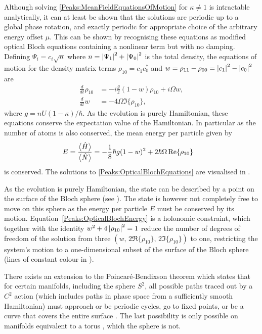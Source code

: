 Although solving \eqref{Peaks:MeanFieldEquationsOfMotion} for $\kappa \neq 1$ is intractable analytically, it can at least be shown that the solutions are periodic up to a global phase rotation, and exactly periodic for appropriate choice of the arbitrary energy offset $\mu$. This can be shown by recognising these equations as modified optical Bloch equations \citep[\S 5.B]{Scully} containing a nonlinear term but with no damping. Defining $\Psi_i = c_i\sqrt{n}$ where $n = \left|\Psi_1\right|^2 + \left|\Psi_0\right|^2$ is the total density, the equations of motion for the density matrix terms $\rho_{10} = c_{1}^{}c_{0}^*$ and $w = \rho_{11}-\rho_{00} = \left|c_1\right|^2 - \left|c_0\right|^2$ are
\begin{subequations}
    \label{Peaks:OpticalBlochEquations}
    \begin{align}
        \frac{d}{dt}\rho_{10} &= -i\frac{g}{2} (1-w)\rho_{10} + i \Omega w,\\
        \frac{d }{dt}w &= -4 \Omega \Im\{\rho_{10}\},
    \end{align}
\end{subequations}
where $g = n U (1-\kappa)/\hbar$. As the evolution is purely Hamiltonian, these equations conserve the expectation value of the Hamiltonian. In particular as the number of atoms is also conserved, the mean energy per particle given by
\begin{align}
    E &= \frac{\mean{\hat{H}}}{\mean{\hat{N}}} = -\frac{1}{8}\hbar g(1 - w)^2 + 2 \hbar \Omega \Re\{\rho_{10}\}
    \label{Peaks:OpticalBlochEnergy}
\end{align}
is conserved. The solutions to \eqref{Peaks:OpticalBlochEquations} are visualised in .

As the evolution is purely Hamiltonian, the state can be described by a point on the surface of the Bloch sphere (see ).  The state is however not completely free to move on this sphere as the energy per particle $E$ must be conserved by its motion.  Equation~\eqref{Peaks:OpticalBlochEnergy} is a holonomic constraint, which together with the identity $w^2 + 4 \left|\rho_{10}\right|^2 = 1$ reduce the number of degrees of freedom of the solution from three $(w,\, 2\Re\{\rho_{10}\},\, 2\Im\{\rho_{10}\})$ to one, restricting the system's motion to a one-dimensional subset of the surface of the Bloch sphere (lines of constant colour in ).  

There exists an extension to the Poincaré-Bendixson theorem which states that for certain manifolds, including the sphere $S^2$, all possible paths traced out by a $C^2$ action (which includes paths in phase space from a sufficiently smooth Hamiltonian) must approach or be periodic cycles, go to fixed points, or be a curve that covers the entire surface \citep{Schwartz:1963}.  The last possibility is only possible on manifolds equivalent to a torus \citep{Schwartz:1963}, which the sphere is not.

